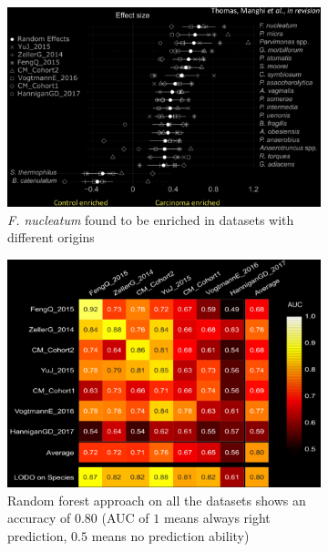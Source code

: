     \begin{figure}[!h]
    \centering
    \begin{subfigure}{.45\textwidth}
        \centering
        \includegraphics[width=\linewidth]{CRCbiomarkers.png}
        \caption{\label{fig:biomarkers} \emph{F. nucleatum} found to be enriched in datasets with different origins}
    \end{subfigure}
    \begin{subfigure}{.45\textwidth}
        \centering
        \includegraphics[width=\linewidth]{CRC_ML.png}
        \caption{\label{fig:ML}Random forest approach on all the datasets shows an accuracy of $0.80$ (AUC of $1$ means always right prediction, $0.5$ means no prediction ability)}
    \end{subfigure}
    \caption{}
    \end{figure}


